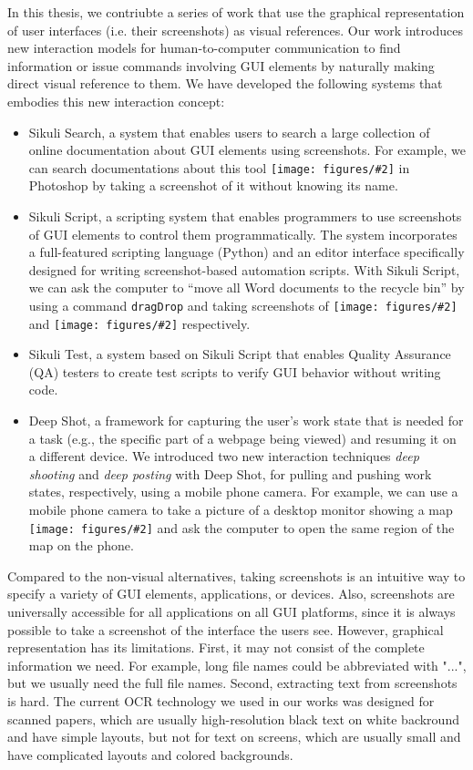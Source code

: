 \documentclass{chi2009}
\newcommand{\img}[2][0.2in]{\texttt{[image: figures/\#2]}}
\newcommand{\dragDrop}[0]{{\tt dragDrop}}
\begin{document}
In this thesis, we contriubte a series of work that use the graphical
representation of user interfaces (i.e. their screenshots) as
visual references.
Our work introduces new interaction models for
human-to-computer communication
to find information or issue commands involving GUI elements 
by naturally making direct visual reference to them.
We have developed the following systems that embodies this new interaction
concept:

\begin{itemize}
\item Sikuli Search, a system that enables users to search a large collection
of online documentation about GUI elements using screenshots. 
For example, we can search documentations about this tool \img{lasso.png}
in Photoshop by taking a screenshot of it without knowing its name.
\item Sikuli Script, a scripting system that enables programmers to use
screenshots of GUI elements to control them programmatically. The system
incorporates a full-featured scripting language (Python) and an editor
interface specifically designed for writing screenshot-based automation
scripts. With Sikuli Script, we can ask the computer to ``move all Word
documents to the recycle bin'' by using a command \dragDrop{} and taking
screenshots of \img{word.png} and \img{recycle.png} respectively.
\item Sikuli Test, a system based on Sikuli Script that enables Quality 
Assurance (QA) testers to create test scripts to verify GUI behavior without
writing code. 
\item Deep Shot, a framework for capturing the user’s work state that is needed
for a task (e.g., the specific part of a webpage being viewed) and resuming it
on a different device. We introduced two new interaction techniques {\it deep
shooting} and {\it deep posting} with Deep Shot, for pulling and pushing work
states, respectively, using a mobile phone camera. For example,
we can use a mobile phone camera
to take a picture of a desktop monitor showing a map \img{map.png}
and ask the computer to open the same region of the map on the phone.
\end{itemize}

Compared to the non-visual alternatives, taking screenshots is an intuitive way
to specify a variety of GUI elements, applications, or devices. Also,
screenshots are universally
accessible for all applications on all GUI platforms, since it is always
possible to take a screenshot of the interface the users see.
However, graphical representation has its limitations. 
First, 
it may not consist of the complete information we need. For example,
long file names could be abbreviated with "...", but we usually need
the full file names. Second, extracting text from screenshots is hard.
The current OCR technology we used in our works was designed for scanned
papers, which are usually high-resolution black text on white backround
and have simple layouts, but not for text on screens,
which are usually small and have complicated layouts and colored backgrounds.
\end{document}
